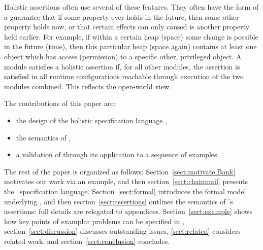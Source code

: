 Holistic assertions often use several of these features. They often have the form  of a guarantee
that if some property ever holds in the future, then some other property holds now, or that
certain effects can only caused is another property held earlier.
For example, if within a certain heap (space) some change is possible in the future (time), then this particular heap 
(space again) contains 
at least one object which has access (permission) to a specific other, privileged object.
A module satisfies a holistic assertion if, for all other modules,
  the assertion is satisfied  in all runtime configurations reachable through execution of the two modules combined.
  This reflects the open-world view.


The contributions of this paper are:
\begin{itemize}
\item the design of the holistic specification language \Chainmail,
\item the semantics of \Chainmail,
\item a validation of \Chainmail through its application to a sequence of examples.
\end{itemize}  
  
  
The rest of the paper is organized as follows: Section~\ref{sect:motivate:Bank} 
motivates our work via an example, and then
section~\ref{sect:chainmail} presents the \Chainmail\ specification
language.  Section~\ref{sect:formal} introduces the formal model
underlying \Chainmail, and then section~\ref{sect:assertions} outlines
the 
semantics of \Chainmail's assertions: full details are relegated to
appendices.   Section~\ref{sect:example} shows how key points of 
examplar problems can be specified in \Chainmail,
section~\ref{sect:discussion}
discusses outstanding issues, \ref{sect:related} considers related
work, and section~\ref{sect:conclusion} concludes.

